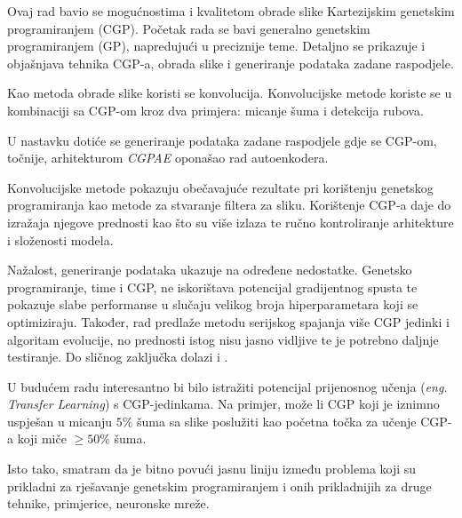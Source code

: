 Ovaj rad bavio se mogućnostima i kvalitetom obrade slike Kartezijskim genetskim programiranjem (CGP).
Početak rada se bavi generalno genetskim programiranjem (GP), napredujući u preciznije teme.
Detaljno se prikazuje i objašnjava tehnika CGP-a, obrada slike i generiranje podataka zadane raspodjele.

Kao metoda obrade slike koristi se konvolucija.
Konvolucijske metode koriste se u kombinaciji sa CGP-om kroz dva primjera: micanje šuma i detekcija rubova.

U nastavku dotiće se generiranje podataka zadane raspodjele gdje se CGP-om, točnije, arhitekturom \emph{CGPAE} oponašao rad autoenkodera.

Konvolucijske metode pokazuju obečavajuće rezultate pri korištenju genetskog programiranja kao metode za stvaranje filtera za sliku.
Korištenje CGP-a daje do izražaja njegove prednosti kao što su više izlaza te ručno kontroliranje arhitekture i složenosti modela.

Nažalost, generiranje podataka ukazuje na određene nedostatke.
Genetsko programiranje, time i CGP, ne iskorištava potencijal gradijentnog spusta te pokazuje slabe performanse u slučaju velikog broja hiperparametara koji se optimiziraju.
Također, rad predlaže metodu serijskog spajanja više CGP jedinki i algoritam evolucije, no prednosti istog nisu jasno vidljive te je potrebno daljnje testiranje.
Do sličnog zaključka dolazi i \cite{conv_gen_programming}.

U budućem radu interesantno bi bilo istražiti potencijal prijenosnog učenja (\emph{eng. Transfer Learning}) s CGP-jedinkama.
Na primjer, može li CGP koji je iznimno uspješan u micanju $5\%$ šuma sa slike poslužiti kao početna točka za učenje CGP-a koji miče $\geq 50\%$ šuma.

Isto tako, smatram da je bitno povući jasnu liniju između problema koji su prikladni za rješavanje genetskim programiranjem i onih prikladnijih za druge tehnike, primjerice, neuronske mreže.
